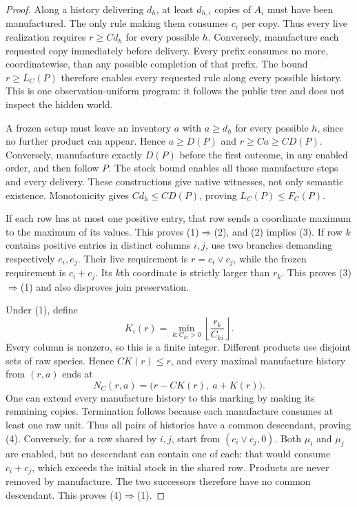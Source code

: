 \documentclass[11pt]{article}
\theoremstyle{definition}
\theoremstyle{remark}
\begin{document}
\begin{proof}
Along a history delivering $d_h$, at least $d_{h,i}$ copies of $A_i$
must have been manufactured. The only rule making them consumes $c_i$
per copy. Thus every live realization requires $r\ge Cd_h$ for every
possible $h$. Conversely, manufacture each requested copy immediately
before delivery. Every prefix consumes no more, coordinatewise, than
any possible completion of that prefix. The bound $r\ge L_C(P)$
therefore enables every requested rule along every possible history.
This is one observation-uniform program: it follows the public tree and
does not inspect the hidden world.

A frozen setup must leave an inventory $a$ with $a\ge d_h$ for every
possible $h$, since no further product can appear. Hence $a\ge D(P)$
and $r\ge Ca\ge CD(P)$. Conversely, manufacture exactly $D(P)$
before the first outcome, in any enabled order, and then follow $P$.
The stock bound enables all those manufacture steps and every delivery.
These constructions give native witnesses, not only semantic existence.
Monotonicity gives $Cd_h\le C D(P)$, proving $L_C(P)\le F_C(P)$.

If each row has at most one positive entry, that row sends a coordinate
maximum to the maximum of its values. This proves (1)$\Rightarrow$(2),
and (2) implies (3). If row $k$ contains positive entries in distinct
columns $i,j$, use two branches demanding respectively $e_i,e_j$.
Their live requirement is $r=c_i\vee c_j$, while the frozen requirement
is $c_i+c_j$. Its $k$th coordinate is strictly larger than $r_k$.
This proves (3)$\Rightarrow$(1) and also disproves join preservation.

Under (1), define
\[
 K_i(r)=\min_{k:C_{ki}>0}\left\lfloor\frac{r_k}{C_{ki}}\right\rfloor.
\]
Every column is nonzero, so this is a finite integer. Different products
use disjoint sets of raw species. Hence $CK(r)\le r$, and every maximal
manufacture history from $(r,a)$ ends at
\[
 N_C(r,a)=\bigl(r-CK(r),\ a+K(r)\bigr).
\tag{*}
\]
One can extend every manufacture history to this marking by making its
remaining copies. Termination follows because each manufacture consumes
at least one raw unit. Thus all pairs of histories have a common
descendant, proving (4). Conversely, for a row shared by $i,j$, start
from $(c_i\vee c_j,0)$. Both $\mu_i$ and $\mu_j$ are enabled, but no
descendant can contain one of each: that would consume $c_i+c_j$, which
exceeds the initial stock in the shared row. Products are never removed
by manufacture. The two successors therefore have no common descendant.
This proves (4)$\Rightarrow$(1).
\end{proof}
\end{document}

